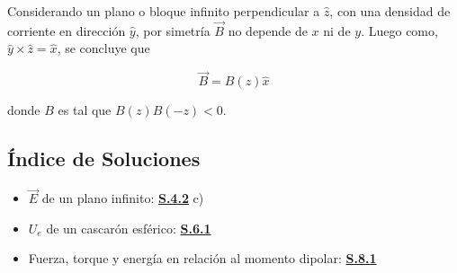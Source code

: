Considerando un plano o bloque infinito perpendicular a $\hat{z}$, con una densidad de corriente en dirección $\hat{y}$, por simetría $\Vec{B}$ no depende de $x$ ni de $y$. Luego como, $\hat{y}\times\hat{z}=\hat{x}$, se concluye que

\[\Vec{B} = B(z)\hat{x}\]

donde $B$ es tal que $B(z)B(-z)<0$.




\subsection{Índice de Soluciones}

\begin{itemize}
    \item $\Vec{E}$ de un plano infinito: \hyperlink{S.4.2}{\textbf{S.4.2}} c)
    \item $U_e$ de un cascarón esférico: \hyperlink{S.6.1}{\textbf{S.6.1}}
    \item Fuerza, torque y energía en relación al momento dipolar: \hyperlink{S.8.1}{\textbf{S.8.1}}
\end{itemize}

\newpage
